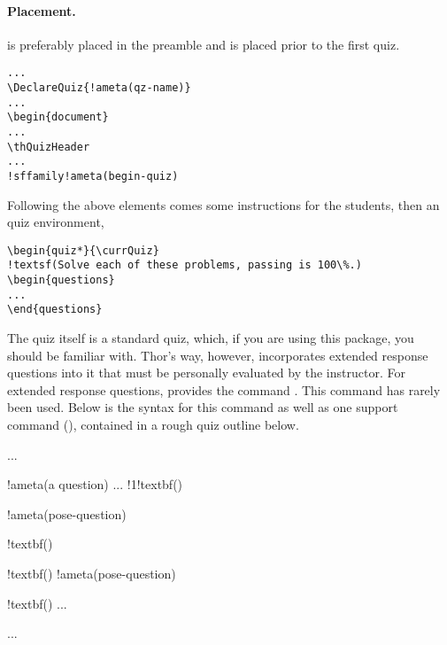 \documentclass{article}
\def\FmtMP#1{\marginpar{\small\itshape\raggedleft#1}}
\edef\amtIndent{\the\parindent}
\begin{document}
\paragraph*{Placement.}  is preferably placed in the preamble\FmtMP{preamble} and
 is placed prior to the first quiz.
\begin{Verbatim}[xleftmargin=\amtIndent,commandchars=!()]
...
\DeclareQuiz{!ameta(qz-name)}
...
\begin{document}
...
\thQuizHeader
...
!sffamily!ameta(begin-quiz)
\end{Verbatim}
Following the above elements comes some instructions\FmtMP{instructions} for the students, then
an  quiz environment,
\begin{Verbatim}[xleftmargin=\amtIndent,commandchars=!()]
\begin{quiz*}{\currQuiz}
!textsf(Solve each of these problems, passing is 100\%.)
\begin{questions}
...
\end{questions}
\end{Verbatim}
The quiz itself is a standard  quiz, which, if you are using
this package, you should be familiar with. Thor's way, however, incorporates
extended response questions into it that must be personally evaluated by the
instructor. For extended response questions,  provides the
command . This command has rarely been used. Below is the
syntax for this command as well as one support command (),
contained in a rough quiz outline below.
\bVerb{}%
\setlength{\eflength}{\linewidth-(\bxSize)-\fboxsep}%
\edef\x{\the\eflength}%
\setlength{\eflength}{\bxSize}%
\def\1{\rlap{\hskip\eflength\smash{\parbox[t]{\x}{\sffamily
Use the \cs{essayQ} command prior to the use of \cs{RespBoxEssay}. The argument
of \cs{essayQ} is the number of points for the question. The number of points
is repeated again with the \cs{PTs} command.
}}}}%
\begin{dCmd}[commandchars=!()]{\bxSize}
\begin{quiz}{\currQuiz}
...
\begin{questions}
\item !ameta(a question)
...
!1!textbf()
\item{} !ameta(pose-question)\par
      !textbf()

!textbf() !ameta(pose-question)\par
      !textbf()
...
\end{questions}
\end{quiz} ...
\end{dCmd}
\end{document}
